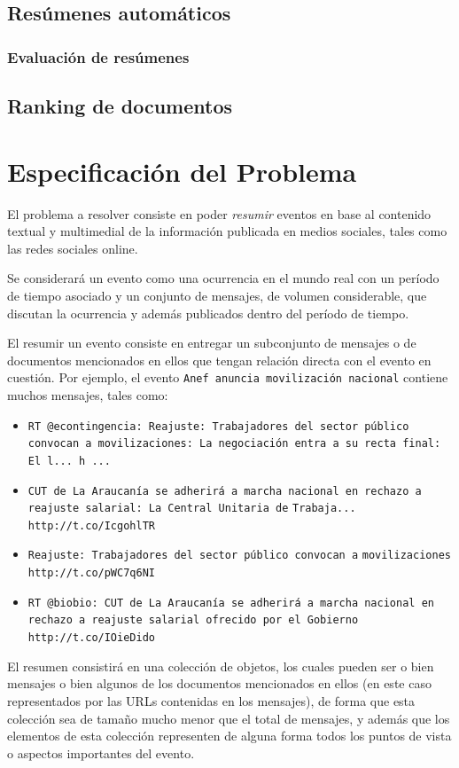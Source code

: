 \documentclass[upright, contnum]{umemoria}
\begin{document}
   

\section{Resúmenes automáticos}
\label{sec-2.4}

\subsection{Evaluación de resúmenes}
\label{sec-2.4.1}

\section{Ranking de documentos}
\label{sec-2.5}

   
\chapter{Especificación del Problema}
\label{sec-3}


  El problema a resolver consiste en poder \emph{resumir} eventos en base
  al contenido textual y multimedial de la información publicada en
  medios sociales, tales como las redes sociales online.

  Se considerará un evento como una ocurrencia en el mundo real
  con un período de tiempo asociado y un conjunto de mensajes, de
  volumen considerable, que discutan la ocurrencia y además publicados
  dentro del período de tiempo. 

  El resumir un evento consiste en entregar un subconjunto de
  mensajes o de documentos mencionados en ellos que tengan
  relación directa con el evento en cuestión. Por ejemplo, el evento
  \texttt{Anef anuncia movilización nacional} contiene muchos mensajes, tales
  como:
\begin{itemize}
\item \texttt{RT @econtingencia: Reajuste: Trabajadores del sector público}
    \texttt{convocan a movilizaciones: La negociación entra a su recta final:}
    \texttt{El l... h ...}
\item \texttt{CUT de La Araucanía se adherirá a marcha nacional en rechazo a}
    \texttt{reajuste salarial: La Central Unitaria de}
    \texttt{Trabaja... http://t.co/IcgohlTR}
\item \texttt{Reajuste: Trabajadores del sector público convocan a}
    \texttt{movilizaciones http://t.co/pWC7q6NI}
\item \texttt{RT @biobio: CUT de La Araucanía se adherirá a marcha nacional en}
    \texttt{rechazo a reajuste salarial ofrecido por el Gobierno}
    \texttt{http://t.co/IOieDido}
\end{itemize}
  El resumen consistirá en una colección de objetos, los cuales pueden
  ser o bien mensajes o bien algunos de los documentos mencionados en
  ellos (en este caso representados por las URLs contenidas en los
  mensajes), de forma que esta colección sea de tamaño mucho menor que
  el total de mensajes, y además que los elementos de esta colección
  representen de alguna forma todos los puntos de vista o aspectos
  importantes del evento.
\end{document}
